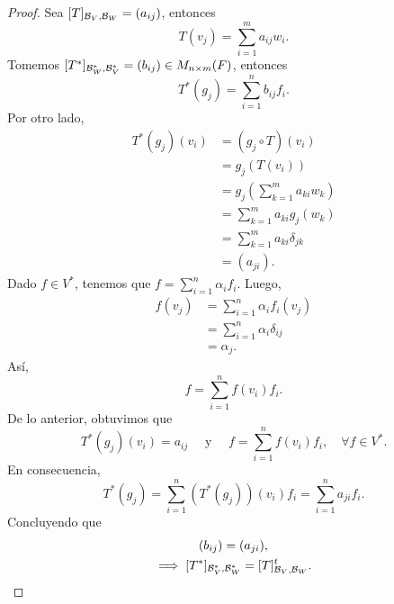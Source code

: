 \documentclass[12pt,a4paper]{book}
\newcommand{\parentesis}[1]{\left(#1\right)}
\begin{document}
    \begin{proof}
        Sea $[T]_{\mathcal{B}_{V}, \mathcal{B}_{W}} = (a_{ij})$, entonces
        \begin{equation*}
        T(v_{j}) = \sum_{i = 1}^{m}a_{ij}w_{i}.
        \end{equation*}
        Tomemos $[T^{*}]_{\mathcal{B}^{*}_{W}, \mathcal{B}^{*}_{V}} = (b_{ij}) \in M_{n \times m}(F)$, entonces
        \begin{equation*}
        T^{*}(g_{j}) = \sum_{i = 1}^{n}b_{ij}f_{i}.
        \end{equation*}
        Por otro lado,
        \begin{align*}
            T^{*}(g_{j})(v_{i}) & = (g_{j} \circ T)(v_{i})\\
            & = g_{j}(T(v_{i}))\\
            & = g_{j}\parentesis{\sum_{k = 1}^{m}a_{ki}w_{k}}\\
            & = \sum_{k = 1}^{m}a_{ki}g_{j}(w_{k})\\
            & = \sum_{k = 1}^{m}a_{ki}\delta_{jk}\\
            & = (a_{ji}).
        \end{align*}
        Dado $f \in V^{*}$, tenemos que $f = \sum_{i = 1}^{n} \alpha_{i}f_{i}$. Luego,
        \begin{align*}
            f(v_{j}) & = \sum_{i = 1}^{n} \alpha_{i}f_{i}(v_{j})\\
            & = \sum_{i = 1}^{n} \alpha_{i} \delta_{ij}\\
            & = \alpha_{j}.
        \end{align*}
        Así,
        \begin{equation*}
        f = \sum_{i = 1}^{n}f(v_{i})f_{i}.
        \end{equation*}
        De lo anterior, obtuvimos que
        \begin{equation*}
        T^{*}(g_{j})(v_{i}) = a_{ij} \quad \text{ y } \quad f = \sum_{i = 1}^{n}f(v_{i})f_{i}, \quad \forall f \in V^{*}.
        \end{equation*}
        En consecuencia,
        \begin{equation*}
        T^{*}(g_{j}) = \sum_{i = 1}^{n}(T^{*}(g_{j}))(v_{i})f_{i} = \sum_{i = 1}^{n}a_{ji}f_{i}.
        \end{equation*}
        Concluyendo que
        \begin{gather*}
            (b_{ij}) = (a_{ji}),\\
            \implies [T^{*}]_{\mathcal{B}^{*}_{V}, \mathcal{B}^{*}_{W}} = [T]^{t}_{\mathcal{B}_{V}, \mathcal{B}_{W}}.
        \end{gather*}
    \end{proof}
\end{document}
